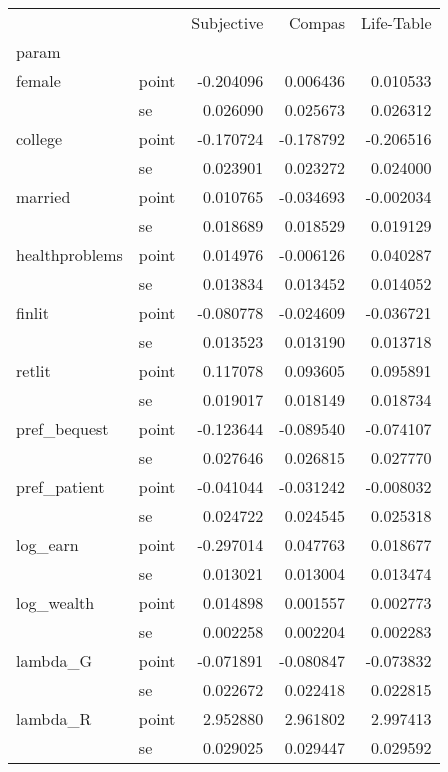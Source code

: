 \begin{tabular}{llrrr}
\toprule
        &    &  Subjective &    Compas &  Life-Table \\
param & {} &             &           &             \\
\midrule
female & point &   -0.204096 &  0.006436 &    0.010533 \\
        & se &    0.026090 &  0.025673 &    0.026312 \\
college & point &   -0.170724 & -0.178792 &   -0.206516 \\
        & se &    0.023901 &  0.023272 &    0.024000 \\
married & point &    0.010765 & -0.034693 &   -0.002034 \\
        & se &    0.018689 &  0.018529 &    0.019129 \\
healthproblems & point &    0.014976 & -0.006126 &    0.040287 \\
        & se &    0.013834 &  0.013452 &    0.014052 \\
finlit & point &   -0.080778 & -0.024609 &   -0.036721 \\
        & se &    0.013523 &  0.013190 &    0.013718 \\
retlit & point &    0.117078 &  0.093605 &    0.095891 \\
        & se &    0.019017 &  0.018149 &    0.018734 \\
pref\_bequest & point &   -0.123644 & -0.089540 &   -0.074107 \\
        & se &    0.027646 &  0.026815 &    0.027770 \\
pref\_patient & point &   -0.041044 & -0.031242 &   -0.008032 \\
        & se &    0.024722 &  0.024545 &    0.025318 \\
log\_earn & point &   -0.297014 &  0.047763 &    0.018677 \\
        & se &    0.013021 &  0.013004 &    0.013474 \\
log\_wealth & point &    0.014898 &  0.001557 &    0.002773 \\
        & se &    0.002258 &  0.002204 &    0.002283 \\
lambda\_G & point &   -0.071891 & -0.080847 &   -0.073832 \\
        & se &    0.022672 &  0.022418 &    0.022815 \\
lambda\_R & point &    2.952880 &  2.961802 &    2.997413 \\
        & se &    0.029025 &  0.029447 &    0.029592 \\

\end{tabular}
